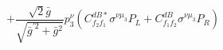 %
\begin{dmath*}
%
  +  \frac{\sqrt{2} {\bar g}{}}{\sqrt{{\bar g}^{\prime 2} + {\bar g}{}^2}} p_3^{\nu} \left(C^{dB*}_{f_2 f_1} \sigma^{\nu  \mu_3} P_L  + C^{dB}_{f_1 f_2} \sigma^{\nu  \mu_3} P_R \right)
%
\end{dmath*}
%
